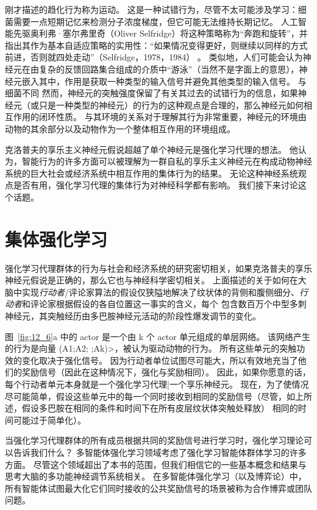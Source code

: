 刚才描述的趋化行为称为运动。
这是一种试错行为，尽管不太可能涉及学习：细菌需要一点短期记忆来检测分子浓度梯度，但它可能无法维持长期记忆。
人工智能先驱奥利弗·塞尔弗里奇（Oliver Selfridge）将这种策略称为“奔跑和旋转”，并指出其作为基本自适应策略的实用性：“如果情况变得更好，则继续以同样的方式前进，否则就四处走动”（Selfridge，1978，1984） 。
类似地，人们可能会认为神经元在由复杂的反馈回路集合组成的介质中“游泳”（当然不是字面上的意思），神经元嵌入其中，作用是获取一种类型的输入信号并避免其他类型的输入信号。
与细菌不同 然而，神经元的突触强度保留了有关其过去的试错行为的信息，如果神经元（或只是一种类型的神经元）的行为的这种观点是合理的，那么神经元如何相互作用的闭环性质。
与其环境的关系对于理解其行为非常重要，神经元的环境由动物的其余部分以及动物作为一个整体相互作用的环境组成。


克洛普夫的享乐主义神经元假说超越了单个神经元是强化学习代理的想法。
他认为，智能行为的许多方面可以被理解为一群自私的享乐主义神经元在构成动物神经系统的巨大社会或经济系统中相互作用的集体行为的结果。
无论这种神经系统观点是否有用，强化学习代理的集体行为对神经科学都有影响。
我们接下来讨论这个话题。


\section{集体强化学习} \label{sec:collective_rl}

强化学习代理群体的行为与社会和经济系统的研究密切相关，如果克洛普夫的享乐神经元假说是正确的，那么它也与神经科学密切相关。
上面描述的关于如何在大脑中实现\textit{行动者}/评论家算法的假设仅狭隘地解决了纹状体的背侧和腹侧细分、\textit{行动者}和评论家根据假设的各自位置这一事实的含义，每个 包含数百万个中型多刺神经元，其突触经历由多巴胺神经元活动的阶段性爆发调节的变化。


图~\ref{fig:12_6}a 中的 actor 是一个由 k 个 actor 单元组成的单层网络。
该网络产生的行为是向量 (A1;A2; ;Ak)>，被认为驱动动物的行为。
所有这些单元的突触功效的变化取决于强化信号。
因为行动者单位试图尽可能大，所以有效地充当了他们的奖励信号（因此在这种情况下，强化与奖励相同）。
因此，如果你愿意的话，每个行动者单元本身就是一个强化学习代理|一个享乐神经元。
现在，为了使情况尽可能简单，假设这些单元中的每一个同时接收到相同的奖励信号（尽管，如上所述，假设多巴胺在相同的条件和时间下在所有皮层纹状体突触处释放） 相同的时间可能过于简单化）。


当强化学习代理群体的所有成员根据共同的奖励信号进行学习时，强化学习理论可以告诉我们什么？
多智能体强化学习领域考虑了强化学习智能体群体学习的许多方面。
尽管这个领域超出了本书的范围，但我们相信它的一些基本概念和结果与思考大脑的多功能神经调节系统相关。
在多智能体强化学习（以及博弈论）中，所有智能体试图最大化它们同时接收的公共奖励信号的场景被称为合作博弈或团队问题。


